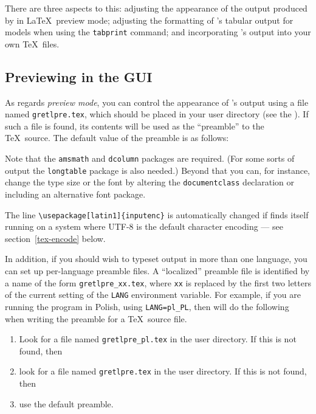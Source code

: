 There are three aspects to this: adjusting the appearance of the
output produced by  in \LaTeX\ preview mode; adjusting the
formatting of 's tabular output for models when using the
\texttt{tabprint} command; and incorporating 's output into
your own \TeX\ files.


\subsection{Previewing in the GUI}

As regards \emph{preview mode}, you can control the appearance of
's output using a file named \verb+gretlpre.tex+, which
should be placed in your  user directory (see the \GCR).
If such a file is found, its contents will be used as the ``preamble''
to the \TeX\ source.  The default value of the preamble is as follows:
    

Note that the \verb+amsmath+ and \verb+dcolumn+ packages are required.
(For some sorts of output the \verb+longtable+ package is also
needed.)  Beyond that you can, for instance, change the type size or
the font by altering the \texttt{documentclass} declaration or
including an alternative font package.

The line \verb|\usepackage[latin1]{inputenc}| is automatically
changed if  finds itself running on a system where UTF-8
is the default character encoding --- see section~\ref{tex-encode}
below.

In addition, if you should wish to typeset  output in more
than one language, you can set up per-language preamble files.  A
``localized'' preamble file is identified by a name of the form
\verb|gretlpre_xx.tex|, where \texttt{xx} is replaced by the first two
letters of the current setting of the \texttt{LANG} environment
variable.  For example, if you are running the program in Polish,
using \verb|LANG=pl_PL|, then  will do the following when
writing the preamble for a \TeX\ source file.

\begin{enumerate}
\item Look for a file named \verb|gretlpre_pl.tex| in the 
  user directory.  If this is not found, then
\item look for a file named \verb|gretlpre.tex| in the 
  user directory.  If this is not found, then
\item use the default preamble.
\end{enumerate}

